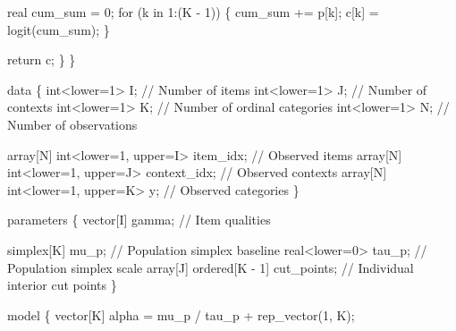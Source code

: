 \documentclass[
  letterpaper,
  DIV=11,
  numbers=noendperiod]{scrartcl}
\newenvironment{Shaded}{\begin{snugshade}}{\end{snugshade}}
\newcommand{\CommentTok}[1]{\textcolor[rgb]{0.37,0.37,0.37}{#1}}
\newcommand{\ControlFlowTok}[1]{\textcolor[rgb]{0.00,0.23,0.31}{#1}}
\newcommand{\DataTypeTok}[1]{\textcolor[rgb]{0.68,0.00,0.00}{#1}}
\newcommand{\DecValTok}[1]{\textcolor[rgb]{0.68,0.00,0.00}{#1}}
\newcommand{\KeywordTok}[1]{\textcolor[rgb]{0.00,0.23,0.31}{#1}}
\newcommand{\NormalTok}[1]{\textcolor[rgb]{0.00,0.23,0.31}{#1}}
\begin{document}
\begin{codelisting}
\begin{Shaded}
\begin{Highlighting}[]
    \DataTypeTok{real}\NormalTok{ cum\_sum = }\DecValTok{0}\NormalTok{;}
    \ControlFlowTok{for}\NormalTok{ (k }\ControlFlowTok{in} \DecValTok{1}\NormalTok{:(K {-} }\DecValTok{1}\NormalTok{)) \{}
\NormalTok{      cum\_sum += p[k];}
\NormalTok{      c[k] = logit(cum\_sum);}
\NormalTok{    \}}

    \ControlFlowTok{return}\NormalTok{ c;}
\NormalTok{  \}}
\NormalTok{\}}

\KeywordTok{data}\NormalTok{ \{}
  \DataTypeTok{int}\NormalTok{\textless{}}\KeywordTok{lower}\NormalTok{=}\DecValTok{1}\NormalTok{\textgreater{} I; }\CommentTok{// Number of items}
  \DataTypeTok{int}\NormalTok{\textless{}}\KeywordTok{lower}\NormalTok{=}\DecValTok{1}\NormalTok{\textgreater{} J; }\CommentTok{// Number of contexts}
  \DataTypeTok{int}\NormalTok{\textless{}}\KeywordTok{lower}\NormalTok{=}\DecValTok{1}\NormalTok{\textgreater{} K; }\CommentTok{// Number of ordinal categories}
  \DataTypeTok{int}\NormalTok{\textless{}}\KeywordTok{lower}\NormalTok{=}\DecValTok{1}\NormalTok{\textgreater{} N; }\CommentTok{// Number of observations}

  \DataTypeTok{array}\NormalTok{[N] }\DataTypeTok{int}\NormalTok{\textless{}}\KeywordTok{lower}\NormalTok{=}\DecValTok{1}\NormalTok{, }\KeywordTok{upper}\NormalTok{=I\textgreater{} item\_idx;    }\CommentTok{// Observed items}
  \DataTypeTok{array}\NormalTok{[N] }\DataTypeTok{int}\NormalTok{\textless{}}\KeywordTok{lower}\NormalTok{=}\DecValTok{1}\NormalTok{, }\KeywordTok{upper}\NormalTok{=J\textgreater{} context\_idx; }\CommentTok{// Observed contexts}
  \DataTypeTok{array}\NormalTok{[N] }\DataTypeTok{int}\NormalTok{\textless{}}\KeywordTok{lower}\NormalTok{=}\DecValTok{1}\NormalTok{, }\KeywordTok{upper}\NormalTok{=K\textgreater{} y;           }\CommentTok{// Observed categories}
\NormalTok{\}}

\KeywordTok{parameters}\NormalTok{ \{}
  \DataTypeTok{vector}\NormalTok{[I] gamma;                    }\CommentTok{// Item qualities}

  \DataTypeTok{simplex}\NormalTok{[K] mu\_p;                    }\CommentTok{// Population simplex baseline}
  \DataTypeTok{real}\NormalTok{\textless{}}\KeywordTok{lower}\NormalTok{=}\DecValTok{0}\NormalTok{\textgreater{} tau\_p;                }\CommentTok{// Population simplex scale}
  \DataTypeTok{array}\NormalTok{[J] }\DataTypeTok{ordered}\NormalTok{[K {-} }\DecValTok{1}\NormalTok{] cut\_points; }\CommentTok{// Individual interior cut points}
\NormalTok{\}}

\KeywordTok{model}\NormalTok{ \{}
  \DataTypeTok{vector}\NormalTok{[K] alpha = mu\_p / tau\_p + rep\_vector(}\DecValTok{1}\NormalTok{, K);}


\end{Highlighting}
\end{Shaded}
\end{codelisting}
\end{document}
